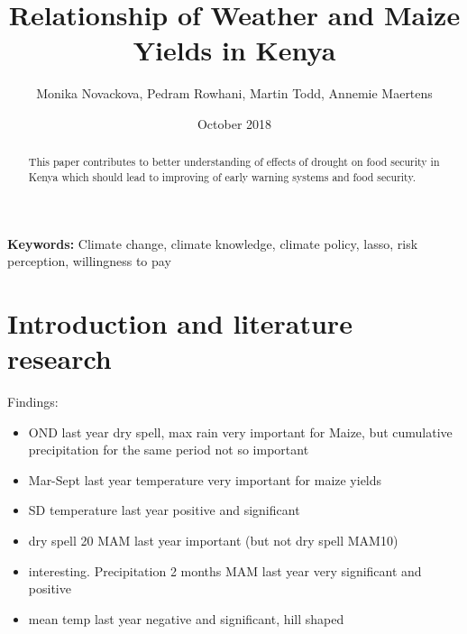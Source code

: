 \documentclass[a4paper,12pt]{article}
\date{\normalsize{October 2018}}
\title{\Large \bf Relationship of Weather and Maize Yields in Kenya}
\author{Monika Novackova, Pedram Rowhani, Martin Todd, Annemie Maertens}
\affil{\small{Department of Geography, University of Sussex, Falmer, UK}}
\begin{document}
  

\makeatletter
\def\hlinewd#1{%
\noalign{\ifnum0=`}\fi\hrule \@height #1 %
\futurelet\reserved@a\@xhline}
\makeatother

\maketitle
\vfill

\doublespacing

\begin{abstract}
\noindent This paper contributes to better understanding of effects of drought on food security in Kenya which should lead to improving of early warning systems and food security. 
\\
\end{abstract}



\noindent \textbf{Keywords:} Climate change, climate knowledge, climate policy, lasso, risk perception, willingness to pay\\




\newpage
\sloppy


\section{Introduction  and literature research}\label{Introduction}


\large Findings:
\begin{itemize}
\item OND last year dry spell, max rain very important for Maize, but cumulative precipitation for the same period not so important

\item Mar-Sept last year temperature very important for maize yields
\item SD temperature last year positive and significant
\item dry spell 20 MAM last year important (but not dry spell MAM10)
\item interesting. Precipitation 2 months MAM last year very significant and positive
\item mean temp last year negative and significant, hill shaped 
\end{itemize}
\end{document}
